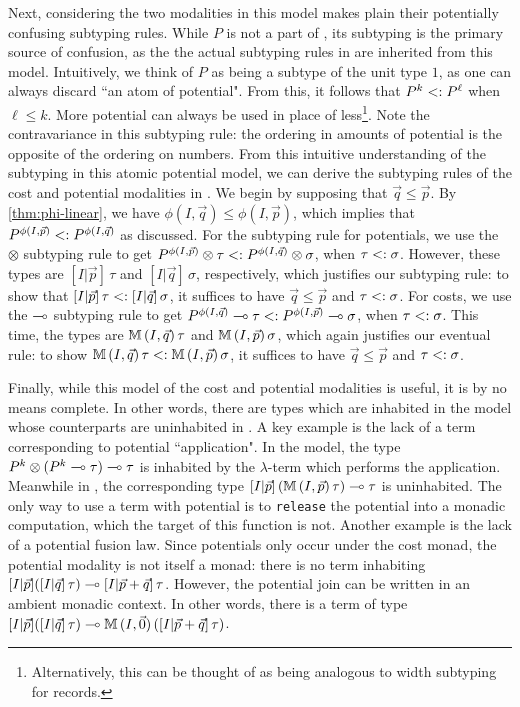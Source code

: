 Next, considering the two modalities in this model makes plain their potentially confusing subtyping rules. While $P$ is not a part of \dlambdaamor, its subtyping is the primary source of confusion, as the the actual subtyping rules in \lambdaamor are inherited from this model. Intuitively, we think of $P$ as being a subtype of the unit type $1$, as one can always discard ``an atom of potential". From this, it follows that $P^k <: P^\ell$ when $\ell \leq k$. More potential can always be used in place of less\footnote{
Alternatively, this can be thought of as being analogous to width subtyping for records.
}. Note the contravariance in this subtyping rule: the ordering in amounts of potential is the opposite of the ordering on numbers. From this intuitive understanding of the subtyping in this atomic potential model, we can derive the subtyping rules of the cost and potential modalities in \dlambdaamor. We begin by supposing that $\vec{q} \leq \vec{p}$. By \autoref{thm:phi-linear}, we have $\phi(I,\vec{q}) \leq \phi(I,\vec{p})$, which implies that  $P^{\phi(I,\vec{p})} <: P^{\phi(I,\vec{q})}$ as discussed. For the subtyping rule for potentials, we use the $\otimes$ subtyping rule  to get $P^{\phi(I,\vec{p})} \otimes \tau <: P^{\phi(I,\vec{q})} \otimes \sigma$, when $\tau <: \sigma$. However, these types are $[I|\vec{p}] \, \tau$ and $[I|\vec{q}] \, \sigma$, respectively, which justifies our subtyping rule: to show that $[I|\vec{p}] \, \tau <: [I|\vec{q}] \, \sigma$, it suffices to have $\vec{q} \leq \vec{p}$ and $\tau <: \sigma$. For costs, we use the $\multimap$ subtyping rule to get  $P^{\phi(I,\vec{q})} \multimap \tau <: P^{\phi(I,\vec{p})} \multimap \sigma$, when $\tau <: \sigma$. This time, the types are $\mathbb{M} \, (I,\vec{q}) \, \tau$ and $\mathbb{M} \, (I,\vec{p}) \, \sigma$, which again justifies our eventual rule: to show $\mathbb{M} \, (I,\vec{q}) \, \tau <: \mathbb{M} \, (I,\vec{p}) \, \sigma$, it suffices to have $\vec{q} \leq \vec{p}$ and $\tau <: \sigma$.

Finally, while this model of the cost and potential modalities is useful, it is by no means complete. In other words, there are types which are inhabited in the model whose counterparts are uninhabited in \dlambdaamor. A key example is the lack of a term corresponding to potential ``application". In the model, the type $P^k \otimes (P^k \multimap \tau) \multimap \tau$ is inhabited by the $\lambda$-term which performs the application. Meanwhile in \dlambdaamor, the corresponding type $[I|\vec{p}] \, (\mathbb{M} \, (I,\vec{p})\, \tau) \multimap \tau$ is uninhabited. The only way to use a term with potential is to \texttt{release} the potential into a monadic computation, which the target of this function is not. Another example is the lack of a potential fusion law. Since potentials only occur under the cost monad, the potential modality is not itself a monad: there is no term inhabiting $[I|\vec{p}] ([I|\vec{q}] \, \tau) \multimap [I|\vec{p} + \vec{q}] \, \tau$. However, the potential join can be written in an ambient monadic context. In other words, there is a term of type $[I|\vec{p}] ([I|\vec{q}] \, \tau) \multimap \mathbb{M} \, (I,\vec{0}) \left([I|\vec{p} + \vec{q}] \, \tau\right)$. 

